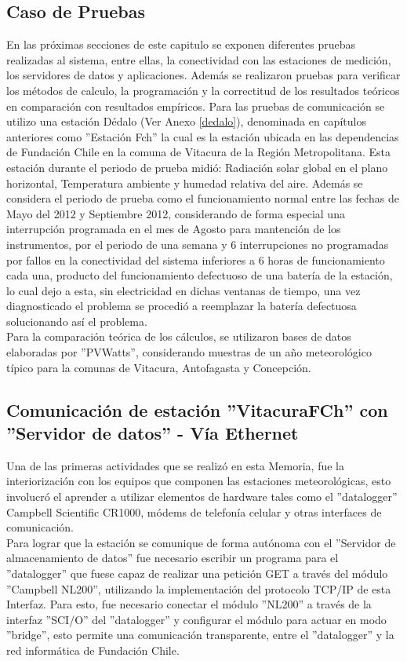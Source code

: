 \subsection{Caso de Pruebas}
En las próximas secciones de este capitulo se exponen diferentes pruebas realizadas al sistema, entre ellas, la conectividad con las estaciones de medición, los servidores de datos y aplicaciones. Además se realizaron pruebas para verificar los métodos de calculo, la programación y la correctitud de los resultados teóricos en comparación con resultados empíricos. Para las pruebas de comunicación se utilizo una estación Dédalo (Ver Anexo \ref{dedalo}), denominada en capítulos anteriores como ''Estación Fch'' la cual es la estación ubicada en las dependencias de Fundación Chile en la comuna de Vitacura de la Región Metropolitana. Esta estación durante el periodo de prueba midió: Radiación solar global en el plano horizontal, Temperatura ambiente y humedad relativa del aire. Además se considera el periodo de prueba como el funcionamiento normal entre las fechas de Mayo del 2012 y Septiembre 2012, considerando de forma especial una interrupción programada en el mes de Agosto para mantención de los instrumentos, por el periodo de una semana y 6 interrupciones no programadas por fallos en la conectividad del sistema inferiores a 6 horas de funcionamiento cada una, producto del funcionamiento defectuoso de una batería de la estación, lo cual dejo a esta, sin electricidad en dichas ventanas de tiempo, una vez diagnosticado el problema se procedió a reemplazar la batería defectuosa solucionando así el problema.\\
Para la comparación teórica de los cálculos, se utilizaron bases de datos elaboradas por ''PVWatts'', considerando muestras de un año meteorológico típico para la comunas de Vitacura, Antofagasta y Concepción.  
 
\subsection{Comunicación de estación ''VitacuraFCh'' con ''Servidor de datos'' - Vía Ethernet}
Una de las primeras actividades que se realizó en esta Memoria, fue la interiorización con los equipos que componen las estaciones meteorológicas, esto involucró el aprender a utilizar elementos de hardware tales como el ''datalogger'' Campbell Scientific CR1000, módems de telefonía celular y otras interfaces de comunicación.\\
Para lograr que la estación se comunique de forma autónoma con el ''Servidor de almacenamiento de datos'' fue necesario escribir un programa para el ''datalogger'' que fuese capaz de realizar una petición GET a través del módulo ''Campbell NL200'', utilizando la implementación del protocolo TCP/IP de esta Interfaz. Para esto, fue necesario conectar el módulo ''NL200'' a través de la interfaz ''SCI/O'' del ''datalogger'' y configurar el módulo para actuar en modo ''bridge'', esto permite una comunicación transparente, entre el ''datalogger'' y la red informática de Fundación Chile.

